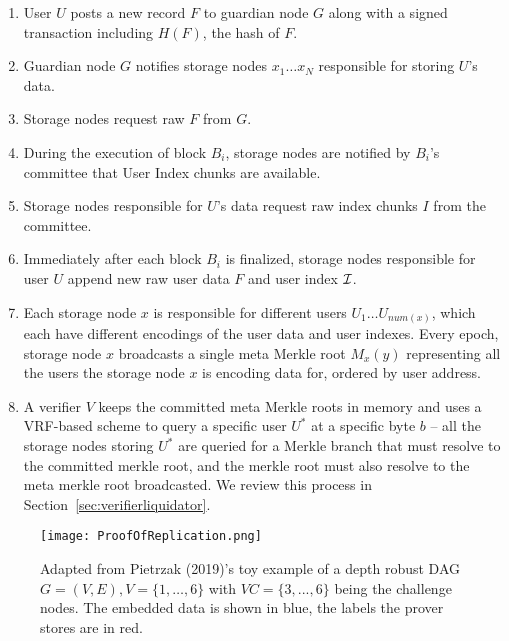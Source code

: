 \documentclass[journal]{IEEEtran}
\begin{document}
\begin{enumerate}
\item User $U$ posts a new record $F$ to guardian node $G$ along with a signed transaction including $H(F)$, the hash of $F$.

\item Guardian node $G$ notifies storage nodes $x_1 \ldots x_N$ responsible for storing $U$'s data.

\item Storage nodes request raw $F$ from $G$.

\item During the execution of block $B_i$, storage nodes are notified by $B_i$'s committee that User Index chunks are available.

\item Storage nodes responsible for $U$'s data request raw index chunks $I$ from the committee.

\item Immediately after each block $B_i$ is finalized, storage nodes responsible for user $U$ append new raw user data $F$ and user index $\cal{I}$.

\item Each storage node $x$ is responsible for different users $U_1 \ldots U_{num(x)}$, which each have different encodings of the user data and user indexes.   Every epoch, storage node $x$ broadcasts a single meta Merkle root $M_x(y)$ representing all the users the storage node $x$ is encoding data for, ordered by user address.

\item A verifier $V$ keeps the committed meta Merkle roots in memory and uses a VRF-based scheme to query a specific user $U^*$ at a specific byte $b$ -- all the storage nodes storing $U^*$ are queried for a Merkle branch that must resolve to the committed merkle root, and the merkle root must also resolve to the meta merkle root broadcasted.  We review this process in Section~\ref{sec:verifierliquidator}.
\end{enumerate}

\begin{figure}
    \centering
    \texttt{[image: ProofOfReplication.png]}
    \caption{Adapted from Pietrzak (2019)'s toy example of a depth robust DAG  $G = (V, E), V = \{1, \ldots , 6\}$ with $VC = \{3, . . . , 6\}$ being the challenge nodes. The embedded data is shown in blue, the labels the prover stores are in red.}
    \label{fig:proof-of-replication}
\end{figure}
\end{document}
